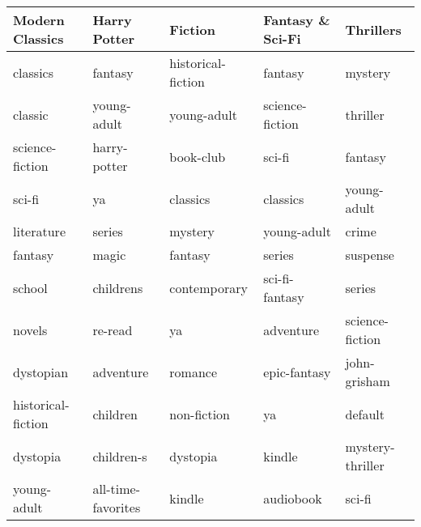 \begin{tabular}{lllll}
\toprule
    Modern Classics &        Harry Potter &             Fiction & Fantasy \& Sci-Fi &         Thrillers \\
\midrule
           classics &             fantasy &  historical-fiction &          fantasy &           mystery \\
            classic &         young-adult &         young-adult &  science-fiction &          thriller \\
    science-fiction &        harry-potter &           book-club &           sci-fi &           fantasy \\
             sci-fi &                  ya &            classics &         classics &       young-adult \\
         literature &              series &             mystery &      young-adult &             crime \\
            fantasy &               magic &             fantasy &           series &          suspense \\
             school &           childrens &        contemporary &   sci-fi-fantasy &            series \\
             novels &             re-read &                  ya &        adventure &   science-fiction \\
          dystopian &           adventure &             romance &     epic-fantasy &      john-grisham \\
 historical-fiction &            children &         non-fiction &               ya &           default \\
           dystopia &          children-s &            dystopia &           kindle &  mystery-thriller \\
        young-adult &  all-time-favorites &              kindle &        audiobook &            sci-fi \\
\bottomrule
\end{tabular}
